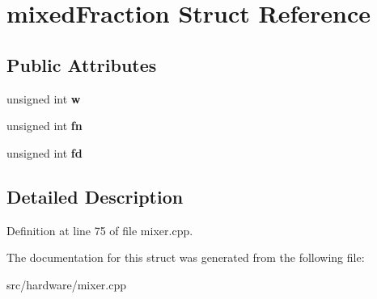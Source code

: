 \hypertarget{structmixedFraction}{\section{mixed\-Fraction Struct Reference}
\label{structmixedFraction}
}
\subsection*{Public Attributes}
\begin{DoxyCompactItemize}
\item 
\hypertarget{structmixedFraction_a484432dffd5bcac1bc2d4e69414bd978}{unsigned int {\bfseries w}}\label{structmixedFraction_a484432dffd5bcac1bc2d4e69414bd978}

\item 
\hypertarget{structmixedFraction_a85d8f9ad58da3ceaf9770e9adf9e7209}{unsigned int {\bfseries fn}}\label{structmixedFraction_a85d8f9ad58da3ceaf9770e9adf9e7209}

\item 
\hypertarget{structmixedFraction_a0e436d4cd7ec6f822b1ba73921cd922f}{unsigned int {\bfseries fd}}\label{structmixedFraction_a0e436d4cd7ec6f822b1ba73921cd922f}

\end{DoxyCompactItemize}


\subsection{Detailed Description}


Definition at line 75 of file mixer.\-cpp.



The documentation for this struct was generated from the following file\-:\begin{DoxyCompactItemize}
\item 
src/hardware/mixer.\-cpp\end{DoxyCompactItemize}

